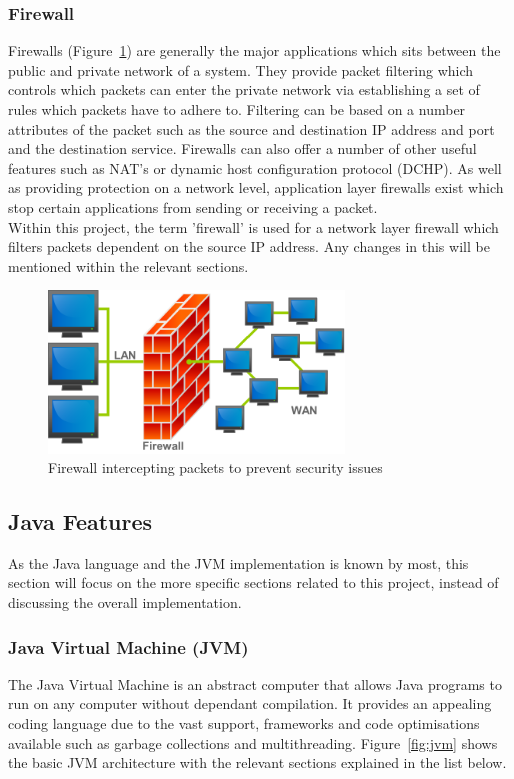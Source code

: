 \documentclass[interim_report.tex]{subfiles}
\begin{document}
\subsubsection{Firewall}
Firewalls (Figure~\ref{fig:firewall}) are generally the major applications which sits between the public and private network of a system. They provide packet filtering which controls which packets can enter the private network via establishing a set of rules which packets have to adhere to. Filtering can be based on a number attributes of the packet such as the source and destination IP address and port and the destination service. Firewalls can also offer a number of other useful features such as NAT's or dynamic host configuration protocol (DCHP). As well as providing protection on a network level, application layer firewalls exist which stop certain applications from sending or receiving a packet. \\
\newline
Within this project, the term 'firewall' is used for a network layer firewall which filters packets dependent on the source IP address. Any changes in this will be mentioned within the relevant sections. \\

\begin{figure}[H]
	\centering
	\includegraphics[width=0.7\textwidth]{img/firewall.png}
	\caption{Firewall intercepting packets to prevent security issues \cite{firewall}}
	\label{fig:firewall}
\end{figure}

\subsection{Java Features}
As the Java language and the JVM implementation is known by most, this section will focus on the more specific sections related to this project, instead of discussing the overall implementation.

\subsubsection{Java Virtual Machine (JVM)}
The Java Virtual Machine is an abstract computer that allows Java programs to run on any computer without dependant compilation. It provides an appealing coding language due to the vast support, frameworks and code optimisations available such as garbage collections and multithreading. Figure~\ref{fig:jvm} shows the basic JVM architecture with the relevant sections explained in the list below.
\end{document}
